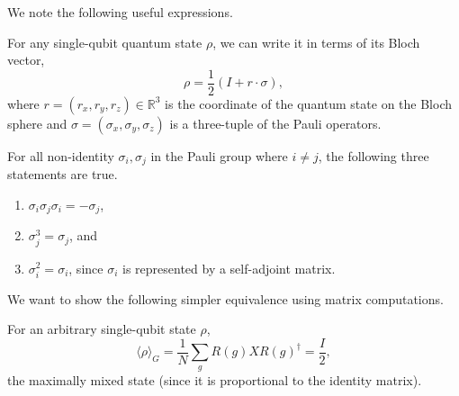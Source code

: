 We note the following useful expressions.
\begin{definition}\label{rm:BlochVector}
    \leanok
    For any single-qubit quantum state $\rho$, we can write it in terms of its Bloch vector,
    \begin{equation}
        \rho = \frac{1}{2} (I + r \cdot \sigma),
    \end{equation}
    where $r = (r_x, r_y, r_z) \in \mathbb{R}^3$ is the coordinate of the quantum state on the Bloch sphere and $\sigma = (\sigma_x, \sigma_y, \sigma_z)$ is a three-tuple of the Pauli operators.
\end{definition}

\begin{remark}\label{rm:SigmaCubed}
    For all non-identity $\sigma_{i}, \sigma_{j}$ in the Pauli group where $i \neq j$, the following three statements are true.
    \begin{enumerate}
        \item $\sigma_{i}\sigma_{j} \sigma_{i} = - \sigma_j$,
        \item $ \sigma_{j}^3 = \sigma_{j}$, and
        \item $\sigma_i^2 = \sigma_i$, since $\sigma_i$ is represented by a self-adjoint matrix.
    \end{enumerate}
\end{remark}

We want to show the following simpler equivalence using matrix computations.
\begin{theorem}\label{thm:TwirlSingleQubit}
    \leanok
    For an arbitrary single-qubit state $\rho$,
    \begin{equation}
        \langle \rho \rangle_{G} = \frac{1}{N} \sum_{g} R(g) X R(g)^{\dagger} = \frac{I}{2},
    \end{equation}
    the maximally mixed state (since it is proportional to the identity matrix).
\end{theorem}

